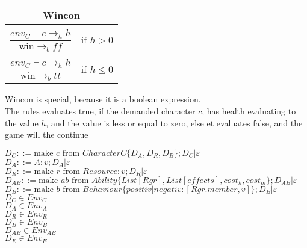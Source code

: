\begin{center}
\begin{tabular}{ l l }
\multicolumn{2}{c}{\textbf{Wincon}}\\
\hline
 & \\
$\dfrac{env_{C} \vdash c \rightarrow_{h} h}{\text{win} \rightarrow_{b} ff}$ & $\text{if } h > 0$\\
 & \\
$\dfrac{env_{C} \vdash c \rightarrow_{h} h}{\text{win} \rightarrow_{b} tt}$ & $\text{if } h \leq 0$\\
\end{tabular}
\end{center}
Wincon is special, because it is a boolean expression. \\
The rules evaluates true, if the demanded character $c$, has health evaluating to the value $h$, and the value is less or equal to zero, else et evaluates false, and the game will the continue 
\pagebreak

	$D_C ::= \text{make } c \text{ from } Character C \{ D_A, D_R, D_B \}; D_C | \varepsilon$\\
	$D_A ::= A: v; D_A | \varepsilon$\\
	$D_R ::= \text{make } r \text{ from } Resource: v; D_R | \varepsilon$\\
	$D_{AB} ::= \text{make } ab \text{ from } Ability \{ List[Rgr], List[effects], cost_h, cost_m \}; D_{AB} | \varepsilon$\\
	$D_B ::= \text{make } b \text{ from } Behaviour \{positiv | negativ : [Rgr.member, v]\}; D_B | \varepsilon$\\

	
	$D_C \in Env_C$\\
	$D_A \in Env_A$\\
	$D_R \in Env_R$\\
	$D_B \in Env_B$\\
	$D_{AB} \in Env_{AB}$\\
	$D_E \in Env_E$\\
	\\
	
